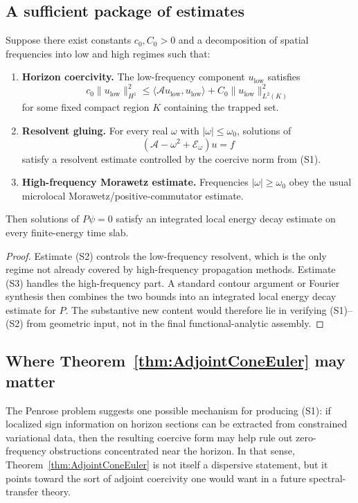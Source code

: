 \subsection{A sufficient package of estimates}

\begin{proposition}\label{prop:ConditionalSpectralTransfer}
Suppose there exist constants $c_0,C_0>0$ and a decomposition of spatial frequencies into low and high regimes such that:
\begin{enumerate}
    \item[(S1)] \textbf{Horizon coercivity.} The low-frequency component $u_{\mathrm{low}}$ satisfies
    \[
        c_0\|u_{\mathrm{low}}\|_{H^1}^2
        \le
        \langle \mathcal A u_{\mathrm{low}},u_{\mathrm{low}}\rangle
        + C_0\|u_{\mathrm{low}}\|_{L^2(K)}^2
    \]
    for some fixed compact region $K$ containing the trapped set.
    \item[(S2)] \textbf{Resolvent gluing.} For every real $\omega$ with $|\omega|\le \omega_0$, solutions of
    \[
        (\mathcal A - \omega^2 + \mathcal E_\omega)u=f
    \]
    satisfy a resolvent estimate controlled by the coercive norm from (S1).
    \item[(S3)] \textbf{High-frequency Morawetz estimate.} Frequencies $|\omega|\ge \omega_0$ obey the usual microlocal Morawetz/positive-commutator estimate.
\end{enumerate}
Then solutions of $P\psi=0$ satisfy an integrated local energy decay estimate on every finite-energy time slab.
\end{proposition}

\begin{proof}
Estimate (S2) controls the low-frequency resolvent, which is the only regime not already covered by high-frequency propagation methods. Estimate (S3) handles the high-frequency part. A standard contour argument or Fourier synthesis then combines the two bounds into an integrated local energy decay estimate for $P$. The substantive new content would therefore lie in verifying (S1)--(S2) from geometric input, not in the final functional-analytic assembly.
\end{proof}

\subsection{Where Theorem~\ref{thm:AdjointConeEuler} may matter}

The Penrose problem suggests one possible mechanism for producing (S1): if localized sign information on horizon sections can be extracted from constrained variational data, then the resulting coercive form may help rule out zero-frequency obstructions concentrated near the horizon. In that sense, Theorem~\ref{thm:AdjointConeEuler} is not itself a dispersive statement, but it points toward the sort of adjoint coercivity one would want in a future spectral-transfer theory.

